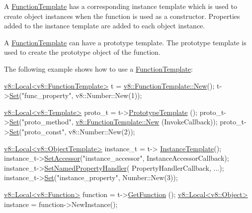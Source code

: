 A \hyperlink{classv8_1_1FunctionTemplate}{Function\-Template} has a corresponding instance template which is used to create object instances when the function is used as a constructor. Properties added to the instance template are added to each object instance.

A \hyperlink{classv8_1_1FunctionTemplate}{Function\-Template} can have a prototype template. The prototype template is used to create the prototype object of the function.

The following example shows how to use a \hyperlink{classv8_1_1FunctionTemplate}{Function\-Template}\-:


\begin{DoxyCode}
\hyperlink{classv8_1_1Local}{v8::Local<v8::FunctionTemplate>} t = 
      \hyperlink{classv8_1_1FunctionTemplate_a67822fdf0ef2ac00e20e923e649f3f5f}{v8::FunctionTemplate::New}();
t->\hyperlink{classv8_1_1Template_a8a29557db5d0bc980752084b925a9b01}{Set}(\textcolor{stringliteral}{"func\_property"}, v8::Number::New(1));

\hyperlink{classv8_1_1Local}{v8::Local<v8::Template>} proto\_t = t->\hyperlink{classv8_1_1FunctionTemplate_aa2bcc2652b5f0fdbc666d943ccf72021}{PrototypeTemplate}
      ();
proto\_t->\hyperlink{classv8_1_1Template_a8a29557db5d0bc980752084b925a9b01}{Set}(\textcolor{stringliteral}{"proto\_method"}, \hyperlink{classv8_1_1FunctionTemplate_a67822fdf0ef2ac00e20e923e649f3f5f}{v8::FunctionTemplate::New}
      (InvokeCallback));
proto\_t->\hyperlink{classv8_1_1Template_a8a29557db5d0bc980752084b925a9b01}{Set}(\textcolor{stringliteral}{"proto\_const"}, v8::Number::New(2));

\hyperlink{classv8_1_1Local}{v8::Local<v8::ObjectTemplate>} instance\_t = t->
      \hyperlink{classv8_1_1FunctionTemplate_a00dd9725566908e8fd14064542f5a781}{InstanceTemplate}();
instance\_t->\hyperlink{classv8_1_1ObjectTemplate_acf245fcdedc797068a1eb4c8d46a5269}{SetAccessor}(\textcolor{stringliteral}{"instance\_accessor"}, 
      InstanceAccessorCallback);
instance\_t->\hyperlink{classv8_1_1ObjectTemplate_ac7bcbb6e2936ab38490680f7e1bfb787}{SetNamedPropertyHandler}(
      PropertyHandlerCallback, ...);
instance\_t->\hyperlink{classv8_1_1Template_a8a29557db5d0bc980752084b925a9b01}{Set}(\textcolor{stringliteral}{"instance\_property"}, Number::New(3));

\hyperlink{classv8_1_1Local}{v8::Local<v8::Function>} \textcolor{keyword}{function} = t->\hyperlink{classv8_1_1FunctionTemplate_a3b8e5e214b2ee34c36138961ebac696a}{GetFunction}
      ();
\hyperlink{classv8_1_1Local}{v8::Local<v8::Object>} instance = \textcolor{keyword}{function}->NewInstance();
\end{DoxyCode}


